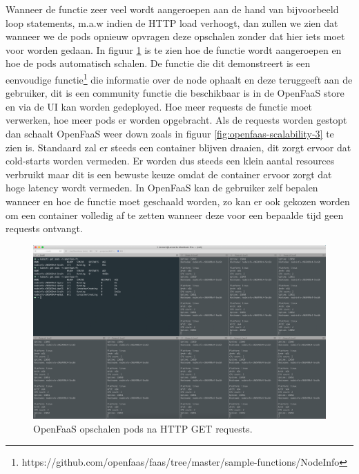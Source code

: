 Wanneer de functie zeer veel wordt aangeroepen aan de hand van bijvoorbeeld loop statements, m.a.w indien de HTTP load verhoogt, dan zullen we zien dat wanneer we de pods opnieuw opvragen deze opschalen zonder dat hier iets moet voor worden gedaan. In figuur \ref{fig:openfaas-scalability-2} is te zien hoe de functie wordt aangeroepen en hoe de pods automatisch schalen. De functie die dit demonstreert is een eenvoudige functie\footnote{https://github.com/openfaas/faas/tree/master/sample-functions/NodeInfo} die informatie over de node ophaalt en deze teruggeeft aan de gebruiker, dit is een community functie die beschikbaar is in de OpenFaaS store en via de UI kan worden gedeployed. Hoe meer requests de functie moet verwerken, hoe meer pods er worden opgebracht. Als de requests worden gestopt dan schaalt OpenFaaS weer down zoals in figuur \ref{fig:openfaas-scalability-3} te zien is. Standaard zal er steeds een container blijven draaien, dit zorgt ervoor dat cold-starts worden vermeden. Er worden dus steeds een klein aantal resources verbruikt maar dit is een bewuste keuze omdat de container ervoor zorgt dat hoge latency wordt vermeden. In OpenFaaS kan de gebruiker zelf bepalen wanneer en hoe de functie moet geschaald worden, zo kan er ook gekozen worden om een container volledig af te zetten wanneer deze voor een bepaalde tijd geen requests ontvangt.

\begin{figure}
    \includegraphics[width=1\textwidth]{img/openfaas-scalability-2.png}
    \caption{OpenFaaS opschalen pods na HTTP GET requests.}
    \label{fig:openfaas-scalability-2}  
\end{figure}

